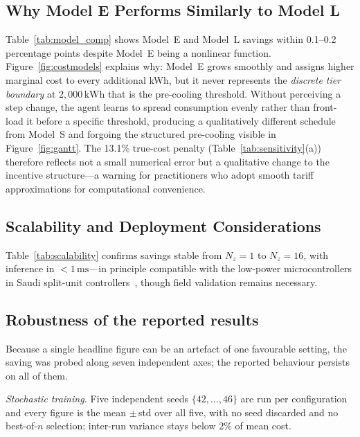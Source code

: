 \documentclass[3p,number]{elsarticle}
\let\oldsubsection\subsection
\renewcommand{\subsection}{\FloatBarrier\oldsubsection}
\newcommand{\kWh}{\text{kWh}}
\begin{document}
\subsection{Why Model E Performs Similarly to Model L}
\label{subsec:disc_modele}
 
Table~\ref{tab:model_comp} shows Model~E and Model~L savings within 0.1--0.2 percentage points despite Model~E being a nonlinear function.
Figure~\ref{fig:costmodels} explains why: Model~E grows smoothly and assigns higher marginal cost to every additional kWh, but it never represents the \emph{discrete tier boundary} at $2{,}000\,\kWh$ that is the pre-cooling threshold.
Without perceiving a step change, the agent learns to spread consumption evenly rather than front-load it before a specific threshold, producing a qualitatively different schedule from Model~S and forgoing the structured pre-cooling visible in Figure~\ref{fig:gantt}.
The 13.1\% true-cost penalty (Table~\ref{tab:sensitivity}(a)) therefore reflects not a small numerical error but a qualitative change to the incentive structure---a warning for practitioners who adopt smooth tariff approximations for computational convenience.
 
\subsection{Scalability and Deployment Considerations}
\label{subsec:disc_scale}
 
Table~\ref{tab:scalability} confirms savings stable from $N_z{=}1$ to $N_z{=}16$, with inference in ${<}1\,\text{ms}$---in principle compatible with the low-power microcontrollers in Saudi split-unit controllers~\cite{Alotaibi2024}, though field validation remains necessary.
 
\subsection{Robustness of the reported results}
\label{subsec:robustness}

Because a single headline figure can be an artefact of one favourable setting,
the saving was probed along seven independent axes; the reported behaviour
persists on all of them.

\emph{Stochastic training.} Five independent seeds $\{42,\dots,46\}$ are run per
configuration and every figure is the mean $\pm$\,std over all five, with no seed
discarded and no best-of-$n$ selection; inter-run variance stays below $2\%$ of
mean cost.
\end{document}
